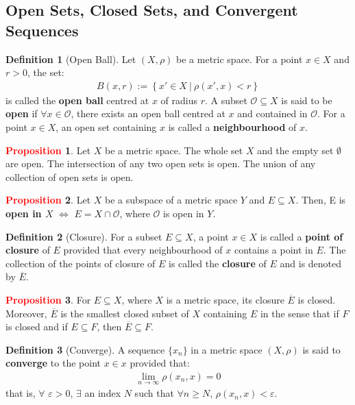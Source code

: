 \documentclass[11pt]{article}
\newcommand{\open}[0]{\mathcal{O}}
\theoremstyle{definition}
\theoremstyle{definition}
\newcommand{\sets}[2]{ \left\{ #1\ |\ #2 \right\}}
\theoremstyle{definition}
\newtheorem{definition}{\textcolor{OliveGreen}{Definition}}
\newtheorem{prop}{\textcolor{red}{Proposition}}
\theoremstyle{remark}
\begin{document}
\subsection{Open Sets, Closed Sets, and Convergent Sequences}

\begin{definition}[Open Ball]
	Let $(X, \rho)$ be a metric space. For a point $x \in X$ and $r>0$, the set: 
	\begin{align}
		B(x,r) := \sets{x' \in X}{\rho(x', x) < r}
	\end{align}
	is called the \textbf{open ball} centred at $x$ of radius $r$. A subset $\open \subseteq X$ is said to be \textbf{open} if $\forall x \in \open$, there exists an open ball centred at $x$ and contained in $\open$. For a point $x \in X$, an open set containing $x$ is called a \textbf{neighbourhood} of $x$.  
\end{definition}

\begin{prop}
	Let $X$ be a metric space. The whole set $X$ and the empty set $\emptyset$ are open. The intersection of any two open sets is open. The union of any collection of open sets is open. 
\end{prop}

\begin{prop}
	Let $X$ be a subspace of a metric space $Y$ and $E \subseteq X$. Then, E is \textbf{open in $X$} $\iff$ $E = X \cap \open$, where $\open$ is open in $Y$. 
\end{prop}

\begin{definition}[Closure]
	For a subset $E \subseteq X$, a point $x \in X$ is called a \textbf{point of closure} of $E$ provided that every neighbourhood of $x$ contains a point in $E$. The collection of the points of closure of $E$ is called the \textbf{closure} of $E$ and is denoted by $\overline{E}$. 
\end{definition}

\begin{prop}
	For $E \subseteq X$, where $X$ is a metric space, its closure $\overline{E}$ is closed. Moreover, $\overline{E}$ is the smallest closed subset of $X$ containing $E$ in the sense that if $F$ is closed and if $E \subseteq F$, then $\overline{E} \subseteq F$. 
\end{prop}

\begin{definition}[Converge]
	A sequence $\{ x_n \}$ in a metric space $(X, \rho)$ is said to \textbf{converge} to the point $x \in x$ provided that: 
	\begin{align*}
		\lim_{n \rightarrow \infty} \rho(x_n, x) = 0 	
	\end{align*}
	that is, $\forall$ $\varepsilon > 0$, $\exists$ an index $N$ such that $\forall n \geq N$, $\rho(x_n, x) < \varepsilon$. 
\end{definition}
\end{document}
